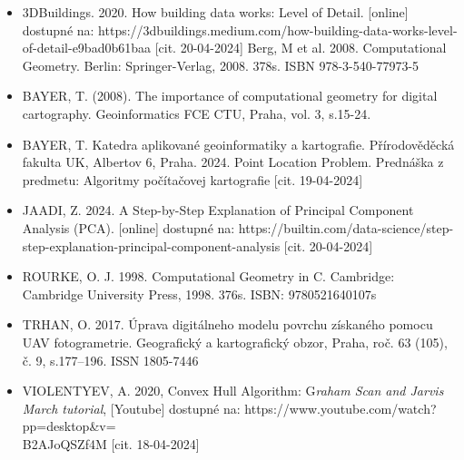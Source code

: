 \documentclass[12pt]{article}
\begin{document}
\begin{itemize}
     
   
    \item 3DBuildings. 2020. How building data works: Level of Detail. [online] dostupné na: https://3dbuildings.medium.com/how-building-data-works-level-of-detail-e9bad0b61baa [cit. 20-04-2024]
    \itemDe Berg, M et al. 2008. Computational Geometry. Berlin: Springer-Verlag, 2008. 378s. ISBN 978-3-540-77973-5 
    
    \item BAYER, T. (2008). The importance of computational geometry for digital cartography. Geoinformatics FCE CTU, Praha, vol. 3, s.15-24.
    \item BAYER, T. Katedra aplikované geoinformatiky a kartografie. Přírodověděcká fakulta UK, Albertov 6, Praha. 2024. Point Location Problem. Prednáška z predmetu: Algoritmy počítačovej kartografie [cit. 19-04-2024]
    
     \item JAADI, Z. 2024. A Step-by-Step Explanation of Principal Component Analysis (PCA). [online] dostupné na: https://builtin.com/data-science/step-step-explanation-principal-component-analysis [cit. 20-04-2024]
     \item ROURKE, O. J. 1998. Computational Geometry in C. Cambridge: Cambridge University Press, 1998.  376s. ISBN: 9780521640107s
     \item TRHAN, O. 2017. Úprava digitálneho modelu povrchu získaného pomocu UAV fotogrametrie. Geografický a kartografický obzor, Praha, roč. 63 (105), č. 9, s.177–196. ISSN 1805-7446
    \item VIOLENTYEV, A. 2020, Convex Hull Algorithm: G\textit{raham Scan and Jarvis March tutorial}, [Youtube] dostupné na: https://www.youtube.com/watch?pp=desktop\&v=\\B2AJoQSZf4M [cit. 18-04-2024] 
\end{itemize}
\end{document}
